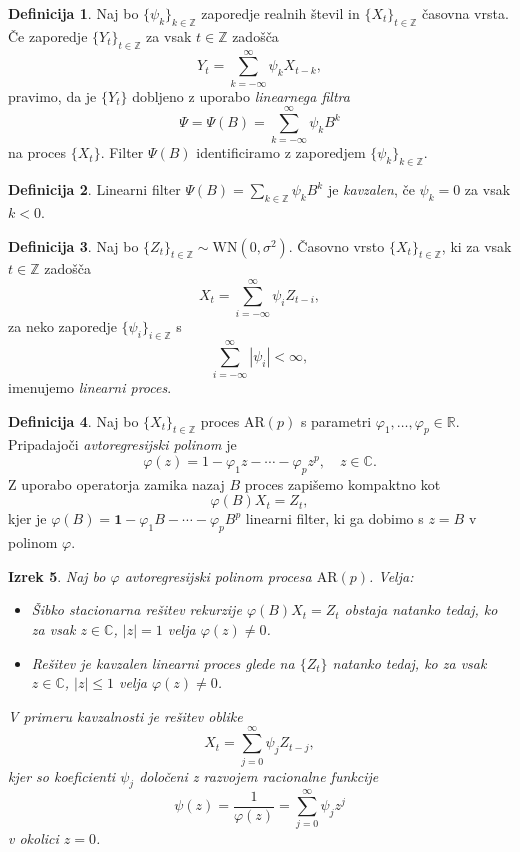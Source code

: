 \documentclass[11pt]{amsart}
\newcommand{\Z}{\mathbb{Z}}
\newcommand{\R}{\mathbb{R}}
\newcommand{\WN}{\mathrm{WN}}
\providecommand{\abs}[1]{\left\lvert #1 \right\rvert}
\theoremstyle{definition}
\newtheorem{definicija}{Definicija}[section]
\theoremstyle{plain}
\newtheorem{izrek}[definicija]{Izrek}
\begin{document}
\begin{definicija}
    Naj bo $\{\psi_k\}_{k \in \Z}$ zaporedje realnih števil in $\{X_t\}_{t \in \Z}$ časovna 
    vrsta. Če zaporedje $\{Y_t\}_{t \in \Z}$ za vsak $t \in \Z$ zadošča
    \[
        Y_t = \sum_{k = -\infty}^{\infty} \psi_k X_{t-k},
    \]
    pravimo, da je $\{Y_t\}$ dobljeno z uporabo \emph{linearnega filtra}
    \[
        \Psi = \Psi(B) = \sum_{k = -\infty}^{\infty} \psi_k B^k
    \]
    na proces $\{X_t\}$. Filter $\Psi(B)$ identificiramo z zaporedjem $\{\psi_k\}_{k \in \Z}$.
\end{definicija}

\begin{definicija}
    Linearni filter $\Psi(B) = \sum_{k \in \Z} \psi_k B^k$ je \emph{kavzalen}, če $\psi_k = 0$ 
    za vsak $k < 0$.
\end{definicija}

\begin{definicija}
    Naj bo $\{Z_t\}_{t \in \Z} \sim \WN(0, \sigma^2)$. Časovno vrsto $\{X_t\}_{t \in \Z}$, 
    ki za vsak $t \in \Z$ zadošča
    \[
        X_t = \sum_{i = -\infty}^{\infty} \psi_i Z_{t-i},
    \]
    za neko zaporedje $\{\psi_i\}_{i \in \Z}$ s 
    \[
        \sum_{i=-\infty}^{\infty} \abs{\psi_i} < \infty,
    \] 
    imenujemo \emph{linearni proces}.
\end{definicija}

\begin{definicija}
    Naj bo $\{X_t\}_{t \in \Z}$ proces $\mathrm{AR}(p)$ s parametri $\varphi_1, \ldots, \varphi_p \in \R$.
    Pripadajoči \emph{avtoregresijski polinom} je
    \[
        \varphi(z) = 1 - \varphi_1 z - \cdots - \varphi_p z^p, \quad z \in \mathbb{C}.
    \]
    Z uporabo operatorja zamika nazaj $B$ proces zapišemo kompaktno kot
    \[
        \varphi(B) X_t = Z_t,
    \]
    kjer je $\varphi(B) = \mathbf{1} - \varphi_1 B - \cdots - \varphi_p B^p$ linearni filter, 
    ki ga dobimo s $z = B$ v polinom $\varphi$.
\end{definicija}

\begin{izrek}
    Naj bo $\varphi$ avtoregresijski polinom procesa $\mathrm{AR}(p)$. Velja:
    \begin{itemize}
        \item Šibko stacionarna rešitev rekurzije $\varphi(B) X_t = Z_t$ obstaja natanko tedaj, 
              ko za vsak $z \in \mathbb{C}$, $\abs{z} = 1$ velja $\varphi(z) \neq 0$.
        \item Rešitev je kavzalen linearni proces glede na $\{Z_t\}$ natanko tedaj, ko za 
              vsak $z \in \mathbb{C}$, $\abs{z} \leq 1$ velja $\varphi(z) \neq 0$.
    \end{itemize}
    V primeru kavzalnosti je rešitev oblike
    \[
        X_t = \sum_{j=0}^{\infty} \psi_j Z_{t-j},
    \]
    kjer so koeficienti $\psi_j$ določeni z razvojem racionalne funkcije
    \[
        \psi(z) = \frac{1}{\varphi(z)} = \sum_{j=0}^{\infty} \psi_j z^j
    \]
    v okolici $z = 0$.
\end{izrek}
\end{document}
